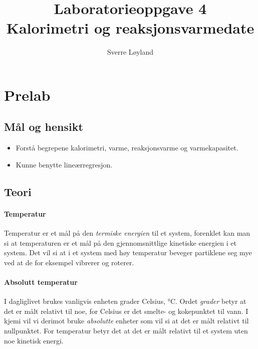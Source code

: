 


\title{Laboratorieoppgave 4\\
	   Kalorimetri og reaksjonsvarmedate}
\author{Sverre Løyland}
\date{}


	
	\maketitle
	
	\section{Prelab}
	
	\subsection{Mål og hensikt}
	\begin{itemize}
		\item Forstå begrepene kalorimetri, varme, reaksjonsvarme og varmekapasitet.
		
		\item Kunne benytte lineærregresjon.
	\end{itemize}	
	
	\subsection{Teori}
	\paragraph{Temperatur}
	Temperatur er et mål på den \emph{termiske energien} til et system, forenklet kan man si at temperaturen er et mål på den gjennomsnittlige kinetiske energien i et system.
	Det vil si at i et system med høy temperatur beveger partiklene seg mye ved at de for eksempel vibrerer og roterer.
	
	\paragraph{Absolutt temperatur}
	I dagliglivet brukes vanligvis enheten grader Celsius, \si{\degreeCelsius}.
	Ordet \emph{grader} betyr at det er målt relativt til noe, for Celsius er det smelte- og kokepunktet til vann. I kjemi vil vi derimot bruke \emph{absolutte} enheter som vil si at det er målt relativt til nullpunktet.
	For temperatur betyr det at det er målt relativt til et system uten noe kinetisk energi.
	
